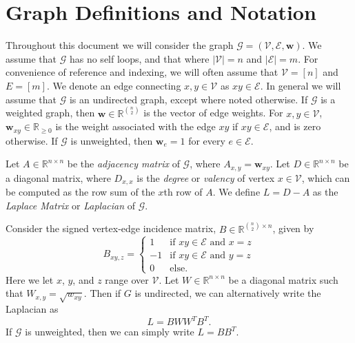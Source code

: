 \documentclass{report}
\begin{document}
\section{Graph Definitions and Notation} \label{background:sec:graphdef}

Throughout this document we will consider the graph $\mathcal{G} = (\mathcal{V}, \mathcal{E}, \mathbf{w})$.
We assume that $\mathcal{G}$ has no self loops, and that where $|\mathcal{V}| = n$ and $|\mathcal{E}| = m$.
For convenience of reference and indexing, we will often assume that $\mathcal{V} = [n]$ and $E = [m]$. 
We denote an edge connecting $x, y \in \mathcal{V}$ as $xy \in \mathcal{E}$. 
In general we will assume that $\mathcal{G}$ is an  undirected graph, except where noted otherwise. 
If $\mathcal{G}$ is a weighted graph, then $\mathbf{w} \in \mathbb{R}^{{n \choose 2}}$ is the vector of edge weights. 
For $x, y \in \mathcal{V}$, $\mathbf{w}_{xy} \in \mathbb{R}_{\geq 0}$ is the weight associated with the edge $xy$ if $xy \in \mathcal{E}$, and is zero otherwise.
If $\mathcal{G}$ is unweighted, then $\mathbf{w}_e = 1$ for every $e \in \mathcal{E}$. 

Let $A \in \mathbb{R}^{n\times n}$ be the \emph{adjacency matrix} of $\mathcal{G}$, where $A_{x,y} = \mathbf{w}_{xy}$.
Let $D \in \mathbb{R}^{n\times n}$ be a diagonal matrix, where $D_{x,x}$ is the \emph{degree} or \emph{valency} of vertex $x \in \mathcal{V}$, which can be computed as the row sum of the $x$th row of $A$. 
We define $L = D - A$ as the \emph{Laplace Matrix} or \emph{Laplacian} of $\mathcal{G}$.

Consider the signed vertex-edge incidence matrix, $B \in \mathbb{R}^{{n \choose 2} \times n}$, given by
%
\begin{equation} \label{eq:veim}
B_{xy,z} = 
\begin{cases}
1 & \textrm{if $xy \in \mathcal{E}$ and $x=z$} \\
-1 & \textrm{if $xy \in \mathcal{E}$ and $y=z$} \\
0 & \textrm{else}.
\end{cases}
\end{equation}
%
Here we let $x$, $y$, and $z$ range over $\mathcal{V}$. 
Let $W \in \mathbb{R}^{n \times n}$ be a diagonal matrix such that $W_{x,y} = \sqrt{w_{xy}}$.
Then if $G$ is undirected, we can alternatively write the Laplacian as 
%
\begin{equation} \label{eq:laplacian}
L = BWW^TB^T.
\end{equation}
%
If $\mathcal{G}$ is unweighted, then we can simply write $L = BB^T$. 
\end{document}

